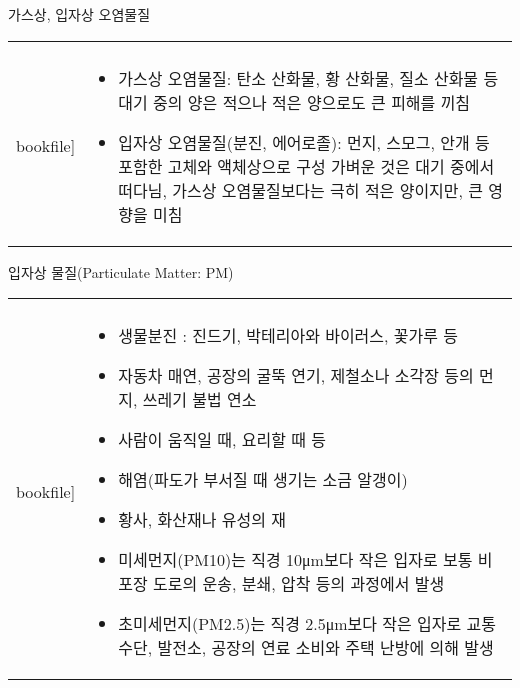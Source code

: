 \begin{frame}[t]{가스상, 입자상 오염물질}
	\begin{tabular}{ll}
		\begin{minipage}[t]{0.4\textwidth}\scriptsize
			\begin{figure}[t]
				\texttt{[image: \\bookfile]}
			\end{figure}
		\end{minipage}	
		&
		\begin{minipage}[t]{0.55\textwidth} \scriptsize	
			\begin{itemize}
				\item 가스상 오염물질: 탄소 산화물, 황 산화물, 질소 산화물 등
				대기 중의 양은 적으나 적은 양으로도 큰 피해를 끼침
				
				\item 입자상 오염물질(분진, 에어로졸): 먼지, 스모그, 안개 등 포함한 고체와 액체상으로 구성
				가벼운 것은 대기 중에서 떠다님, 가스상 오염물질보다는 극히 적은 양이지만, 큰 영향을 미침
				
			\end{itemize}

		\end{minipage}
	\end{tabular}
\end{frame}



\begin{frame}[t]{입자상 물질(Particulate Matter: PM)}
	\begin{tabular}{ll}
		\begin{minipage}[t]{0.4\textwidth}\scriptsize
			\begin{figure}[t]
				\texttt{[image: \\bookfile]}
			\end{figure}
		\end{minipage}	
		&
		\begin{minipage}[t]{0.55\textwidth} \scriptsize	
			\begin{itemize}
				\item 생물분진 : 진드기, 박테리아와 바이러스, 꽃가루 등
				\item 자동차 매연, 공장의 굴뚝 연기, 제철소나 소각장 등의 먼지, 쓰레기 불법 연소
				\item 사람이 움직일 때, 요리할 때 등
				\item 해염(파도가 부서질 때 생기는 소금 알갱이)
				\item 황사, 화산재나 유성의 재
				
				\item 미세먼지(PM10)는 직경 10μm보다 작은 입자로 보통 비포장 도로의 운송, 분쇄, 압착 등의 과정에서 발생
				\item 초미세먼지(PM2.5)는 직경 2.5μm보다 작은 입자로 교통 수단, 발전소, 공장의 연료 소비와 주택 난방에 의해 발생
									
			\end{itemize}

		\end{minipage}
	\end{tabular}
\end{frame}



